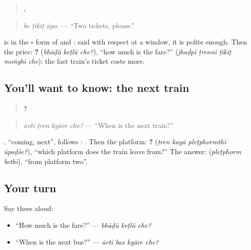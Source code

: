 \begin{grammarlens}[title={Grammar Lens: asking for a ticket}]
\begin{quote}
\textbf{  .}
\end{quote}

\begin{quote}
\emph{be ṭikiṭ āpo.} — \textquotedblleft{}Two tickets, please.\textquotedblright{}
\end{quote}

\textbf{} is \textbf{} in the \textbf{-} form of \textbf{} and \textbf{}: said with respect at a window, it is polite enough. Then the price: \textbf{  ?} (\emph{bhāḍũ keṭlũ che?}), \textquotedblleft{}how much is the fare?\textquotedblright{} \textbf{    } (\emph{jhaḍpī ṭrennī ṭikiṭ moṅghī che}): the fast train's ticket costs more.
\end{grammarlens}

\subsection*{You'll want to know: the next train}
\begin{quote}
\textbf{   ?}
\end{quote}

\begin{quote}
\emph{āvtī ṭren kyāre che?} — \textquotedblleft{}When is the next train?\textquotedblright{}
\end{quote}

\textbf{}, \textquotedblleft{}coming, next\textquotedblright{}, follows \textbf{}: \textbf{}. Then the platform: \textbf{   ?} (\emph{ṭren kayā pleṭphormthī ūpaḍśe?}), \textquotedblleft{}which platform does the train leave from?\textquotedblright{} The answer: \textbf{ } (\emph{pleṭphorm bethī}), \textquotedblleft{}from platform two\textquotedblright{}.

\subsection*{Your turn}
Say these aloud:

\begin{itemize}
\raggedright
  \item \textquotedblleft{}How much is the fare?\textquotedblright{} — \emph{bhāḍũ keṭlũ che?}
  \item \textquotedblleft{}When is the next bus?\textquotedblright{} — \emph{āvtī bas kyāre che?}
\end{itemize}

